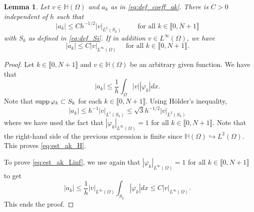 \documentclass[10 pt]{article}
\newcommand\inter[1]{\llbracket #1\rrbracket}
\newtheorem{lemma}[theorem]{Lemma}
\numberwithin{equation}{section}
\begin{document}
%
\begin{lemma}\label{lem:bounds_aks}
Let $v\in \mathbb H(\Omega)$ and $a_k$ as in \eqref{eq:def_coeff_ak}. There is $C>0$ independent of $h$ such that
%
\begin{equation}\label{eq:est_ak_H}
    |a_k|\leq C h^{-1/2} |v|_{L^2(S_k)}\qquad \text{ for all } k\in\inter{0,N+1}
\end{equation}
%
with $S_k$ as defined in \eqref{eq:def_Si}. If in addition $v\in L^\infty(\Omega)$, we have
\begin{equation}\label{eq:est_ak_Linf}
    |a_k|\leq C |v|_{L^\infty(\Omega)} \quad\text{ for all } k\in\inter{0,N+1}.
\end{equation}
\end{lemma}
%
\begin{proof}
Let $k\in\inter{0,N+1}$ and $v\in\mathbb H(\Omega)$ be an arbitrary given function. We have that
%
\begin{equation*}
    |a_k|\leq \frac{1}{h}\int_{\Omega}|v||\varphi_k|dx.
\end{equation*}
%
Note that $\textnormal{supp}\,\varphi_k\subset S_k$ for each $k\in\inter{0,N+1}$. Using H\"older's inequality,
%
\begin{equation*}
    |a_k|\leq h^{-1}|v|_{L^1(S_k)}\leq \sqrt{3}h^{-1/2}|v|_{L^2(S_k)}
\end{equation*}
%
where we have used the fact that $|\varphi_k|_{L^\infty(\Omega)}=1$ for all $k\in\inter{0,N+1}$. Note that the right-hand side of the previous expression is finite since $\mathbb H(\Omega)\hookrightarrow L^2(\Omega)$. This proves \eqref{eq:est_ak_H}. 

To prove \eqref{eq:est_ak_Linf}, we use again that $|\varphi_k|_{L^\infty(\Omega)}=1$ for all $k\in\inter{0,N+1}$ to get
%
\begin{equation*}
    |a_k|\leq \frac{1}{h}|v|_{L^\infty(\Omega)}\int_{S_k}|\varphi_k| dx \leq C|v|_{L^\infty(\Omega)}.
\end{equation*}
%
This ends the proof.
\end{proof}
\end{document}
